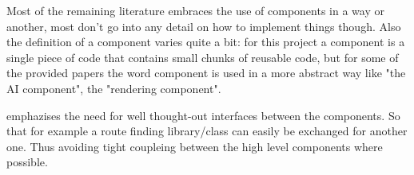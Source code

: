 Most of the remaining literature embraces the use of components in a way or another, most don't go into any detail on
how to implement things though. Also the definition of a component varies quite a bit: for this project a component is a
single piece of code that contains small chunks of reusable code, but for some of the provided papers the word component
is used in a more abstract way like "the AI component", the "rendering component". 

\cite{Rollings.2003} emphazises the need for well thought-out interfaces between the components. So that for example a
route finding library/class can easily be exchanged for another one. Thus avoiding tight coupleing between the high
level components where possible.


